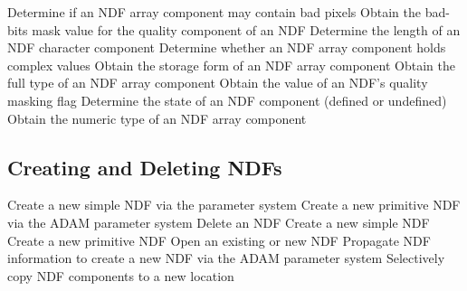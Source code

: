             {Determine if an NDF array component may contain bad pixels}
            {Obtain the bad-bits mask value for the quality component of an NDF}
            {Determine the length of an NDF character component}
            {Determine whether an NDF array component holds complex values}
            {Obtain the storage form of an NDF array component}
            {Obtain the full type of an NDF array component}
            {Obtain the value of an NDF's quality masking flag}
            {Determine the state of an NDF component (defined or undefined)}
            {Obtain the numeric type of an NDF array component}

\subsection{Creating and Deleting NDFs}

            {Create a new simple NDF via the  parameter system}
            {Create a new primitive NDF via the ADAM parameter system}
            {Delete an NDF}
            {Create a new simple NDF}
            {Create a new primitive NDF}
            {Open an existing or new NDF}
            {Propagate NDF information to create a new NDF via the ADAM parameter system}
            {Selectively copy NDF components to a new location}


